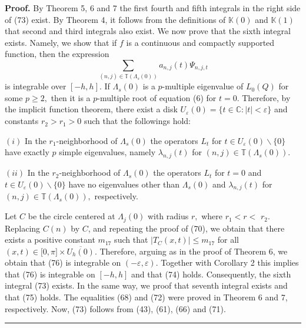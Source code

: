 \documentclass{article}%
\newenvironment{proof}[1][Proof]{\textbf{#1.} }{\ \rule{0.5em}{0.5em}}
\begin{document}
\begin{proof}
By Theorem 5, 6 and 7 the first fourth and fifth integrals in the right side
of (73) exist. By Theorem 4, it follows from the definitions of $\mathbb{K}%
(0)$ and $\mathbb{K}(1)$ that second and third integrals also exist. We now
prove that the sixth integral exists. Namely, we show that if $f$ is a
continuous and compactly supported function, then the expression%
\begin{equation}
\sum_{\left(  n,j\right)  \in\mathbb{T}(\Lambda_{s}(0))}a_{n,j}(t)\Psi_{n,j,t}
\tag{76}%
\end{equation}
is integrable over $[-h,h].$ If $\Lambda_{s}(0)$ is a $p$-multiple eigenvalue
of $L_{0}(Q)$ for some $p\geq2,$ then it is a $p$-multiple root of equation
(6) for $t=0$. Therefore, by the implicit function theorem, there exist a disk
$U_{\varepsilon}(0)=\{t\in\mathbb{C}:\left\vert t\right\vert <\varepsilon\}$
and constants $r_{2}>r_{1}>0$ such that the followings hold:

$(i)$ In the $r_{1}$-neighborhood of $\Lambda_{s}(0)$ the operators $L_{t}$
for $t\in U_{\varepsilon}(0)\backslash\{0\}$ have exactly $p$ simple
eigenvalues, namely $\lambda_{n,j}(t)$ for $\left(  n,j\right)  \in
\mathbb{T}(\Lambda_{s}(0)).$

$(ii)$ In the $r_{2}$-neighborhood of $\Lambda_{s}(0)$ the operators $L_{t}$
for $t=0$ and $t\in U_{\varepsilon}(0)\backslash\{0\}$ have no eigenvalues
other than $\Lambda_{s}(0)$ and $\lambda_{n,j}(t)$ for $\left(  n,j\right)
\in\mathbb{T}(\Lambda_{s}(0)),$ respectively.

Let $C$ be the circle centered at $\Lambda_{j}(0)$ with radius $r,$ where
$r_{1}<r<$ $r_{2}.$ Replacing $C(n)$ by $C$, and repeating the proof of (70),
we obtain that there exists a positive constant $m_{17}$ such that $\left\vert
T_{C}(x,t)\right\vert \leq m_{17}$ for all $(x,t)\in\lbrack0,\pi
]\times\overline{U_{h}(0)}.$ Therefore, arguing as in the proof of Theorem 6,
we obtain that (76) is integrable on $(-\varepsilon,\varepsilon).$ Together
with Corollary 2 this implies that (76) is integrable on $[-h,h]$ and that
(74) holds. Consequently, the sixth integral (73) exists. In the same way, we
proof that seventh integral exists and that (75) holds. The equalities (68)
and (72) were proved in Theorem 6 and 7, respectively. Now, (73) follows from
(43), (61), (66) and (71).
\end{proof}
\end{document}
